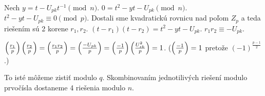 Nech $y = t - U_{pk} t^{-1} \pmod{n}$.
$0=t^2 - y t - U_{pk} \pmod{n}$.
$ t^2 - y t - U_{pk} \equiv 0 \pmod{p}$.
Dostali sme kvadratickú rovnicu nad poľom $Z_p$ a teda riešením sú 2 korene
$r_1,r_2$.
$(t-r_1)(t-r_2) =t^2 - y t - U_{pk}$.
$r_1 r_2 \equiv -U_{pk}$.


$\left( \frac{r_1}{p} \right) \left( \frac{r_2}{p} \right) = \left( \frac{r_1 r_2}{p} \right) =
\left( \frac{-U_{pk}}{p} \right) = \left( \frac{-1}{p} \right) \left( \frac{U_{sk}^2}{p} \right)=1$.
($\left( \frac{-1}{p} \right)=1$ pretože $(-1)^\frac{p-1}{2}$.)

To isté môžeme zistiť modulo $q$.
Skombinovaním jednotilivých riešení modulo prvočísla dostaneme 4 riešenia
modulo $n$.


